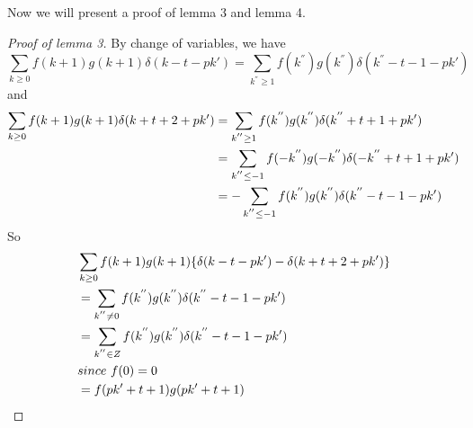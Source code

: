\label{appendix}
Now we will present a proof of lemma 3 and lemma 4.

\begin{proof}[Proof of lemma 3]
By change of variables, we have
\[\sum_{k\ge 0}f(k+1)g(k+1)\delta(k-t-pk')=\sum_{k^{''}\ge 1}f(k^{''})g(k^{''})\delta(k^{''}-t-1-pk')\]
and
\begin{align}\sum_{k\ge 0}f(k+1)g(k+1)\delta(k+t+2+pk')&=\sum_{k^{''}\ge 1}f(k^{''})g(k^{''})\delta(k^{''}+t+1+pk')\notag\\
&=\sum_{k^{''}\le -1}f(-k^{''})g(-k^{''})\delta(-k^{''}+t+1+pk')\notag\\
&=-\sum_{k^{''}\le -1}f(k^{''})g(k^{''})\delta(k^{''}-t-1-pk')\notag\end{align}
So
\begin{align}&\sum_{k\ge 0}f(k+1)g(k+1)\{\delta(k-t-pk')-\delta(k+t+2+pk')\}\notag\\
                       &=\sum_{k^{''}\ne 0}f(k^{''})g(k^{''})\delta(k^{''}-t-1-pk')\notag\\
                       &=\sum_{k^{''}\in Z}f(k^{''})g(k^{''})\delta(k^{''}-t-1-pk')\notag\\
                       & since\ f(0)=0\notag\\
                       &=f(pk'+t+1)g(pk'+t+1)\notag\end{align}
\end{proof}

